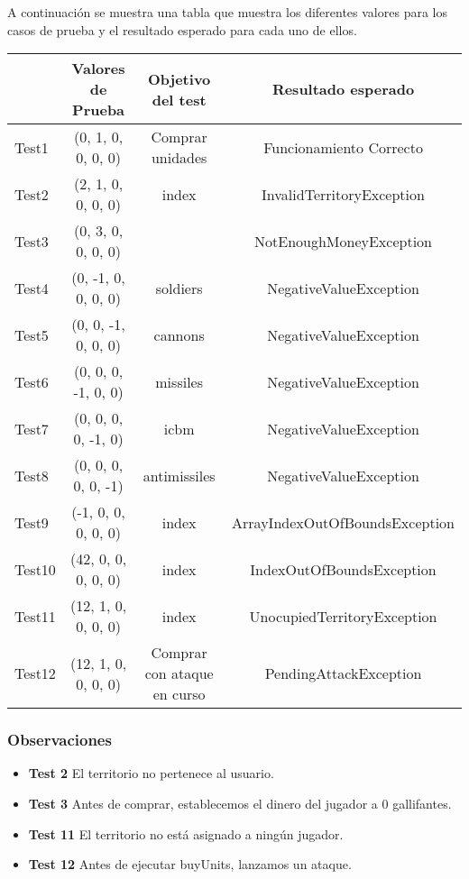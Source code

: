 A continuación se muestra una tabla que muestra los diferentes valores para los casos de prueba y el resultado esperado para cada uno de ellos.

{\footnotesize
\begin{longtable}[c]{lccc}
 & \textbf{Valores de Prueba} & \textbf{Objetivo del test} & \textbf{Resultado esperado}  \\
\hline \hline
\endhead

Test1 & (0, 1, 0, 0, 0, 0) & Comprar unidades & Funcionamiento Correcto\\
Test2 & (2, 1, 0, 0, 0, 0)  & index & InvalidTerritoryException\\
Test3 & (0, 3, 0, 0, 0, 0)  &  & NotEnoughMoneyException \\
Test4 & (0, -1, 0, 0, 0, 0)  & soldiers & NegativeValueException \\
Test5 & (0, 0, -1, 0, 0, 0)  & cannons & NegativeValueException \\
Test6 & (0, 0, 0, -1, 0, 0)  & missiles  & NegativeValueException \\
Test7 & (0, 0, 0, 0, -1, 0)  & icbm & NegativeValueException \\
Test8 & (0, 0, 0, 0, 0, -1)  & antimissiles & NegativeValueException \\
Test9 & (-1, 0, 0, 0, 0, 0) & index & ArrayIndexOutOfBoundsException \\
Test10 & (42, 0, 0, 0, 0, 0) & index & IndexOutOfBoundsException\\
Test11 & (12, 1, 0, 0, 0, 0)  & index & UnocupiedTerritoryException\\
Test12 & (12, 1, 0, 0, 0, 0)  & Comprar con ataque en curso & PendingAttackException\\

\hline
\end{longtable}
\subsubsection{Observaciones}
\begin{itemize}
 \item \textbf{Test 2} El territorio no pertenece al usuario.
\item \textbf{Test 3} Antes de comprar, establecemos el dinero del jugador a 0 gallifantes.
\item \textbf{Test 11} El territorio no está asignado a ningún jugador.
\item \textbf{Test 12} Antes de ejecutar buyUnits, lanzamos un ataque.
\end{itemize}

}

